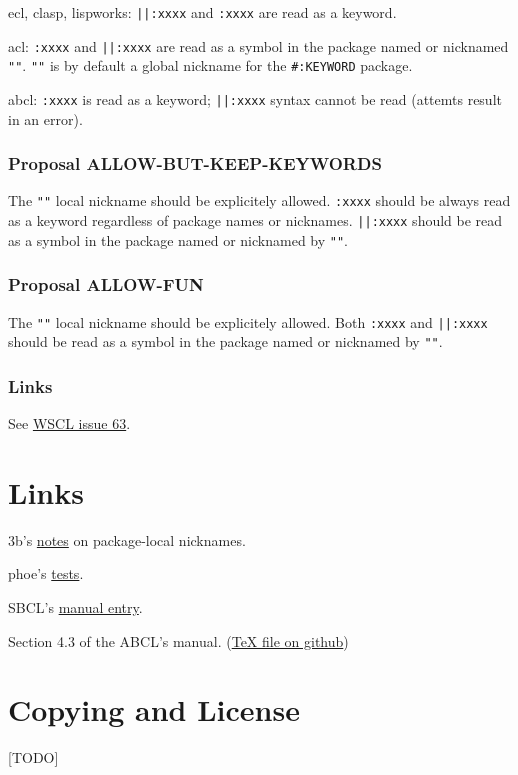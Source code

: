 \documentclass[11pt]{article}
\begin{document}
ecl, clasp, lispworks:
\texttt{||:xxxx} and \texttt{:xxxx} are read as a keyword.

acl:
\texttt{:xxxx} and \texttt{||:xxxx} are read as a symbol in the package named or nicknamed \texttt{""}.
\texttt{""} is by default a global nickname for the \texttt{\#:KEYWORD} package.

abcl:
\texttt{:xxxx} is read as a keyword;
\texttt{||:xxxx} syntax cannot be read (attemts result in an error).
\subsubsection{Proposal ALLOW-BUT-KEEP-KEYWORDS}
\label{sec:orgc5b7e25}
The \texttt{""} local nickname should be explicitely allowed. \texttt{:xxxx} should be always
read as a keyword regardless of package names or nicknames. \texttt{||:xxxx} should be
read as a symbol in the package named or nicknamed by \texttt{""}.
\subsubsection{Proposal ALLOW-FUN}
\label{sec:org62be497}
The \texttt{""} local nickname should be explicitely allowed. Both \texttt{:xxxx} and \texttt{||:xxxx}
should be read as a symbol in the package named or nicknamed by \texttt{""}.
\subsubsection{Links}
\label{sec:org3070206}
See \href{https://github.com/s-expressionists/wscl/issues/63}{WSCL issue 63}.
\section{Links}
\label{sec:orgbc10b02}
3b's \href{https://github.com/3b/package-local-nicknames/blob/master/docs.org}{notes} on package-local nicknames.

phoe's \href{https://github.com/phoe/trivial-package-local-nicknames}{tests}.

SBCL's \href{https://www.sbcl.org/manual/\#Package\_002dLocal-Nicknames}{manual entry}.

Section 4.3 of the ABCL's manual. (\href{https://github.com/armedbear/abcl/blob/master/doc/manual/abcl.tex\#L1249}{\TeX{} file on github})
\section{Copying and License}
\label{sec:org8f00e86}
[TODO]
\end{document}
